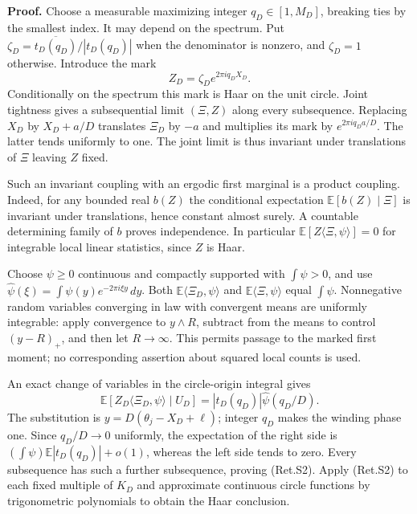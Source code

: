 \textbf{Proof.} Choose a measurable maximizing integer \(q_D\in[1,M_D]\), breaking
ties by the smallest index. It may depend on the spectrum. Put
\(\zeta_D=\overline{t_D(q_D)}/|t_D(q_D)|\) when the denominator is nonzero,
and \(\zeta_D=1\) otherwise. Introduce the mark
\[
                         Z_D=\zeta_D e^{2\pi i q_D X_D}.           \tag{Ret.S3}
\]
Conditionally on the spectrum this mark is Haar on the unit circle.
Joint tightness gives a subsequential limit \((\Xi,Z)\) along every subsequence.
Replacing \(X_D\) by \(X_D+a/D\) translates \(\Xi_D\) by \(-a\) and multiplies its
mark by \(e^{2\pi i q_Da/D}\). The latter tends uniformly to one. The joint
limit is thus invariant under translations of \(\Xi\) leaving \(Z\) fixed.

Such an invariant coupling with an ergodic first marginal is a product
coupling. Indeed, for any bounded real \(b(Z)\) the conditional expectation
\(\mathbb E[b(Z)\mid\Xi]\) is invariant under translations, hence constant
almost surely. A countable determining family of \(b\) proves independence.
In particular \(\mathbb E[Z\langle\Xi,\psi\rangle]=0\) for integrable local
linear statistics, since \(Z\) is Haar.

Choose \(\psi\ge0\) continuous and compactly supported with \(\int\psi>0\),
and use \(\widehat\psi(\xi)=\int\psi(y)e^{-2\pi i\xi y}\,dy\).
Both \(\mathbb E\langle\Xi_D,\psi\rangle\) and
\(\mathbb E\langle\Xi,\psi\rangle\) equal \(\int\psi\).
Nonnegative random variables converging in law with convergent means are
uniformly integrable: apply convergence to \(y\wedge R\), subtract from the
means to control \((y-R)_+\), and then let \(R\to\infty\).
This permits passage to the marked first moment; no corresponding assertion
about squared local counts is used.

An exact change of variables in the circle-origin integral gives
\[
 \mathbb E[Z_D\langle\Xi_D,\psi\rangle\mid U_D]
                     =|t_D(q_D)|\widehat\psi(q_D/D).             \tag{Ret.S4}
\]
The substitution is \(y=D(\theta_j-X_D+\ell)\); integer \(q_D\) makes the
winding phase one. Since \(q_D/D\to0\) uniformly, the expectation of the right
side is \((\int\psi)\mathbb E|t_D(q_D)|+o(1)\), whereas the left side tends
to zero. Every subsequence has such a further subsequence, proving (Ret.S2).
Apply (Ret.S2) to each fixed multiple of \(K_D\) and approximate continuous circle
functions by trigonometric polynomials to obtain the Haar conclusion.

